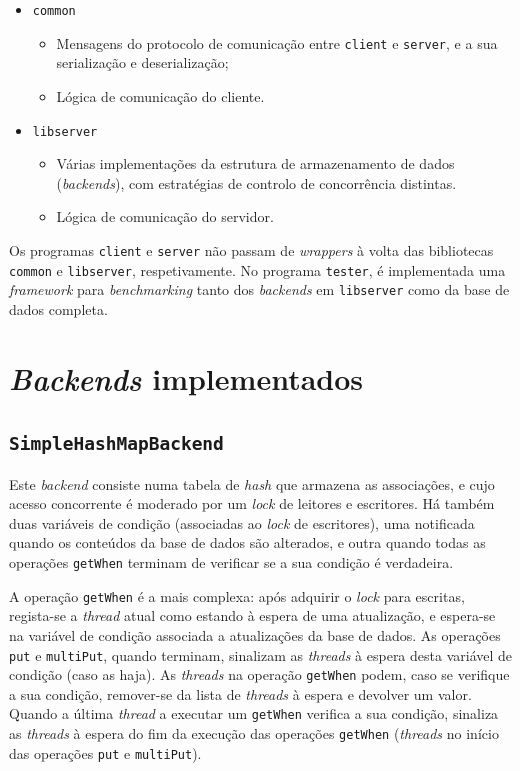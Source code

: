 \documentclass[11pt, a4paper]{article}
\begin{document}
\begin{itemize}
    \item \texttt{common}
    \begin{itemize}
        \item Mensagens do protocolo de comunicação entre \texttt{client} e \texttt{server}, e a sua
            serialização e deserialização;

        \item Lógica de comunicação do cliente.
    \end{itemize}

    \item \texttt{libserver}
    \begin{itemize}
        \item Várias implementações da estrutura de armazenamento de dados (\emph{backends}), com
            estratégias de controlo de concorrência distintas.

        \item Lógica de comunicação do servidor.
    \end{itemize}
\end{itemize}

Os programas \texttt{client} e \texttt{server} não passam de \emph{wrappers} à volta das bibliotecas
\texttt{common} e \texttt{libserver}, respetivamente. No programa \texttt{tester}, é implementada
uma \emph{framework} para \emph{benchmarking} tanto dos \emph{backends} em \texttt{libserver} como
da base de dados completa.

\section{\emph{Backends} implementados}

\subsection{\texttt{SimpleHashMapBackend}}

Este \emph{backend} consiste numa tabela de \emph{hash} que armazena as associações, e cujo acesso
concorrente é moderado por um \emph{lock} de leitores e escritores. Há também duas variáveis de
condição (associadas ao \emph{lock} de escritores), uma notificada quando os conteúdos da base de
dados são alterados, e outra quando todas as operações \texttt{getWhen} terminam de verificar se a
sua condição é verdadeira.

A operação \texttt{getWhen} é a mais complexa: após adquirir o \emph{lock} para escritas, regista-se
a \emph{thread} atual como estando à espera de uma atualização, e espera-se na variável de condição
associada a atualizações da base de dados. As operações \texttt{put} e \texttt{multiPut}, quando
terminam, sinalizam as \emph{threads} à espera desta variável de condição (caso as haja). As
\emph{threads} na operação \texttt{getWhen} podem, caso se verifique a sua condição, remover-se da
lista de \emph{threads} à espera e devolver um valor. Quando a última \emph{thread} a executar um
\texttt{getWhen} verifica a sua condição, sinaliza as \emph{threads} à espera do fim da execução das
operações \texttt{getWhen} (\emph{threads} no início das operações \texttt{put} e \texttt{multiPut}).
\end{document}
